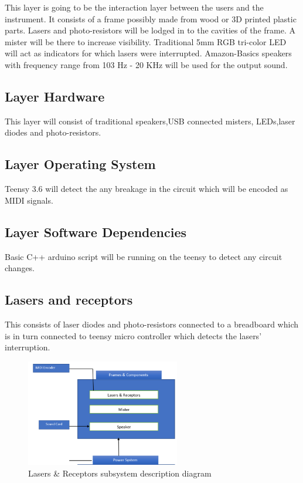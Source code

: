 This layer is going to be the interaction layer between the users and the instrument. It consists of a frame possibly made from wood or 3D printed plastic parts. Lasers and photo-resistors will be lodged in to the cavities of the frame. A mister will be there to increase visibility. Traditional 5mm RGB tri-color LED will act as indicators for which lasers were interrupted. Amazon-Basics speakers with frequency range from 103 Hz - 20 KHz will be used for the output sound.

\subsection{Layer Hardware}
This layer will consist of traditional speakers,USB connected misters, LEDs,laser diodes and photo-resistors.

\subsection{Layer Operating System}
Teensy 3.6 will detect the any breakage in the circuit which will be encoded as MIDI signals.

\subsection{Layer Software Dependencies}
Basic C++ arduino script will be running on the teensy to detect any circuit changes.

\subsection{Lasers and receptors}
This consists of laser diodes and photo-resistors connected to a breadboard which is in turn connected to teensy micro controller which detects the lasers' interruption.

\begin{figure}[h!]
	\centering
 	\includegraphics[width=0.60\textwidth]{images/Frame.png}
 \caption{Lasers & Receptors subsystem description diagram}
\end{figure}

